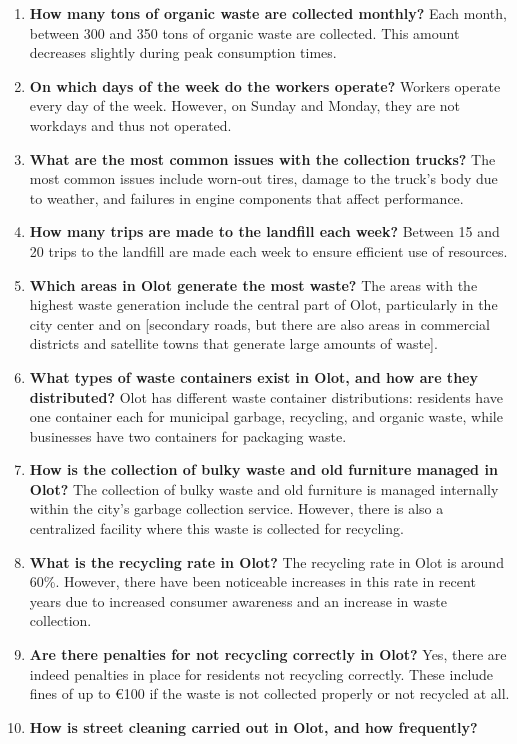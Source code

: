 \begin{enumerate}
Each month, between 300 and 350 tons of packaging waste are collected.
\item \textbf{How many tons of organic waste are collected monthly?}
Each month, between 300 and 350 tons of organic waste are collected. This amount decreases slightly during peak consumption times.
\item \textbf{On which days of the week do the workers operate?}
Workers operate every day of the week. However, on Sunday and Monday, they are not workdays and thus not operated.
\item \textbf{What are the most common issues with the collection trucks?}
The most common issues include worn-out tires, damage to the truck's body due to weather, and failures in engine components that affect performance.
\item \textbf{How many trips are made to the landfill each week?}
Between 15 and 20 trips to the landfill are made each week to ensure efficient use of resources.
\item \textbf{Which areas in Olot generate the most waste?}
The areas with the highest waste generation include the central part of Olot, particularly in the city center and on [secondary roads, but there are also areas in commercial districts and satellite towns that generate large amounts of waste].
\item \textbf{What types of waste containers exist in Olot, and how are they distributed?}
Olot has different waste container distributions: residents have one container each for municipal garbage, recycling, and organic waste, while businesses have two containers for packaging waste.
\item \textbf{How is the collection of bulky waste and old furniture managed in Olot?}
The collection of bulky waste and old furniture is managed internally within the city's garbage collection service. However, there is also a centralized facility where this waste is collected for recycling.
\item \textbf{What is the recycling rate in Olot?}
The recycling rate in Olot is around 60\%. However, there have been noticeable increases in this rate in recent years due to increased consumer awareness and an increase in waste collection.
\item \textbf{Are there penalties for not recycling correctly in Olot?}
Yes, there are indeed penalties in place for residents not recycling correctly. These include fines of up to €100 if the waste is not collected properly or not recycled at all.
\item \textbf{How is street cleaning carried out in Olot, and how frequently?}

\end{enumerate}

